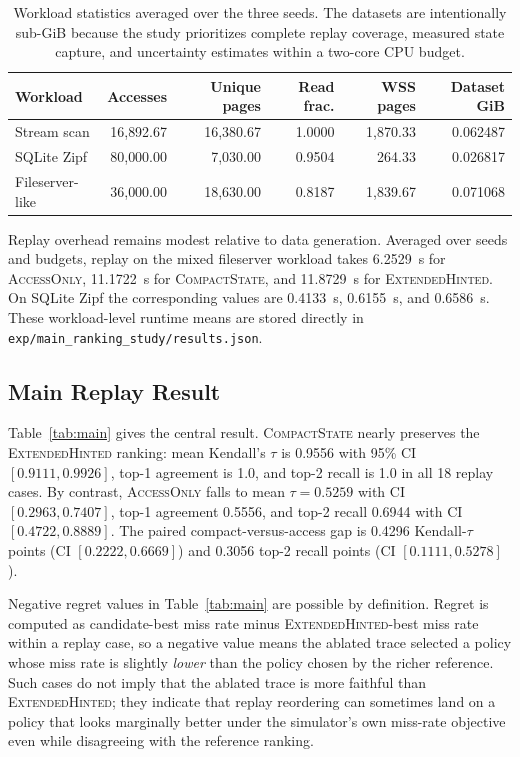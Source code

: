 \documentclass{article}
\newcommand{\traceext}{\textsc{ExtendedHinted}}
\newcommand{\tracecompact}{\textsc{CompactState}}
\newcommand{\traceaccess}{\textsc{AccessOnly}}
\begin{document}
\begin{table}[t]
\caption{Workload statistics averaged over the three seeds. The datasets are intentionally sub-GiB because the study prioritizes complete replay coverage, measured state capture, and uncertainty estimates within a two-core CPU budget.}
\label{tab:workloads}
\centering
\small
\begin{tabular}{lrrrrr}
\toprule
Workload & Accesses & Unique pages & Read frac. & WSS pages & Dataset GiB \\
\midrule
Stream scan & 16{,}892.67 & 16{,}380.67 & 1.0000 & 1{,}870.33 & 0.062487 \\
SQLite Zipf & 80{,}000.00 & 7{,}030.00 & 0.9504 & 264.33 & 0.026817 \\
Fileserver-like & 36{,}000.00 & 18{,}630.00 & 0.8187 & 1{,}839.67 & 0.071068 \\
\bottomrule
\end{tabular}
\end{table}

Replay overhead remains modest relative to data generation. Averaged over seeds and budgets, replay on the mixed fileserver workload takes 6.2529~s for \traceaccess{}, 11.1722~s for \tracecompact{}, and 11.8729~s for \traceext{}. On SQLite Zipf the corresponding values are 0.4133~s, 0.6155~s, and 0.6586~s. These workload-level runtime means are stored directly in \texttt{exp/main\_ranking\_study/results.json}.

\subsection{Main Replay Result}
Table~\ref{tab:main} gives the central result. \tracecompact{} nearly preserves the \traceext{} ranking: mean Kendall's $\tau$ is 0.9556 with 95\% CI $[0.9111, 0.9926]$, top-1 agreement is 1.0, and top-2 recall is 1.0 in all 18 replay cases. By contrast, \traceaccess{} falls to mean $\tau=0.5259$ with CI $[0.2963, 0.7407]$, top-1 agreement 0.5556, and top-2 recall 0.6944 with CI $[0.4722, 0.8889]$. The paired compact-versus-access gap is 0.4296 Kendall-$\tau$ points (CI $[0.2222, 0.6669]$) and 0.3056 top-2 recall points (CI $[0.1111, 0.5278]$).

Negative regret values in Table~\ref{tab:main} are possible by definition. Regret is computed as candidate-best miss rate minus \traceext{}-best miss rate within a replay case, so a negative value means the ablated trace selected a policy whose miss rate is slightly \emph{lower} than the policy chosen by the richer reference. Such cases do not imply that the ablated trace is more faithful than \traceext{}; they indicate that replay reordering can sometimes land on a policy that looks marginally better under the simulator's own miss-rate objective even while disagreeing with the reference ranking.
\end{document}
